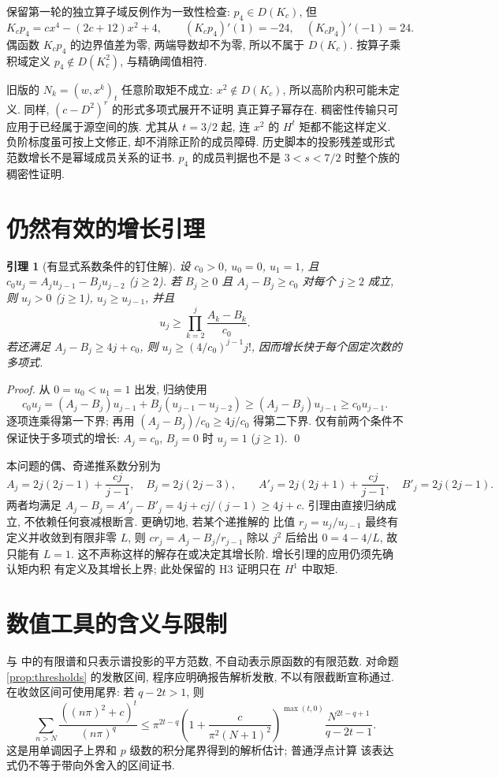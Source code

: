 \documentclass[UTF8]{ctexart}
\newtheorem{lemma}[theorem]{引理}
\begin{document}
保留第一轮的独立算子域反例作为一致性检查:
$p_4\in D(K_c)$, 但
\[
 K_cp_4=cx^4-(2c+12)x^2+4,\qquad (K_cp_4)'(1)=-24,\quad
 (K_cp_4)'(-1)=24.
\]
偶函数 $K_cp_4$ 的边界值差为零, 两端导数却不为零, 所以不属于 $D(K_c)$.
按算子乘积域定义 $p_4\notin D(K_c^2)$, 与精确阈值相符.

旧版的 $N_k=(w,x^k)_t$ 任意阶取矩不成立: $x^2\notin D(K_c)$,
所以高阶内积可能未定义. 同样, $(c-D^2)^r$ 的形式多项式展开不证明
真正算子幂存在. 稠密性传输只可应用于已经属于源空间的族.
尤其从 $t=3/2$ 起, 连 $x^2$ 的 $H^t$ 矩都不能这样定义.
负阶标度虽可按上文修正, 却不消除正阶的成员障碍.
历史脚本的投影残差或形式范数增长不是幂域成员关系的证书.
$p_4$ 的成员判据也不是 $3<s<7/2$ 时整个族的稠密性证明.

\section{仍然有效的增长引理}
\begin{lemma}[有显式系数条件的钉住解]\label{lem:growth}
设 $c_0>0$, $u_0=0$, $u_1=1$, 且
$c_0u_j=A_ju_{j-1}-B_ju_{j-2}$ ($j\ge2$).
若 $B_j\ge0$ 且 $A_j-B_j\ge c_0$ 对每个 $j\ge2$ 成立, 则
$u_j>0$ ($j\ge1$), $u_j\ge u_{j-1}$, 并且
\[
 u_j\ge\prod_{k=2}^j\frac{A_k-B_k}{c_0}.
\]
若还满足 $A_j-B_j\ge4j+c_0$, 则
$u_j\ge(4/c_0)^{j-1}j!$, 因而增长快于每个固定次数的多项式.
\end{lemma}
\begin{proof}
从 $0=u_0<u_1=1$ 出发, 归纳使用
\[
 c_0u_j=(A_j-B_j)u_{j-1}+B_j(u_{j-1}-u_{j-2})
 \ge(A_j-B_j)u_{j-1}\ge c_0u_{j-1}.
\]
逐项连乘得第一下界; 再用 $(A_j-B_j)/c_0\ge4j/c_0$ 得第二下界.
仅有前两个条件不保证快于多项式的增长: $A_j=c_0$, $B_j=0$ 时
$u_j=1$ ($j\ge1$). \qed
\end{proof}

本问题的偶、奇递推系数分别为
\[
 A_j=2j(2j-1)+\frac{cj}{j-1},\quad B_j=2j(2j-3),\qquad
 A'_j=2j(2j+1)+\frac{cj}{j-1},\quad B'_j=2j(2j-1).
\]
两者均满足 $A_j-B_j=A'_j-B'_j=4j+cj/(j-1)\ge4j+c$.
引理由直接归纳成立, 不依赖任何衰减根断言. 更确切地, 若某个递推解的
比值 $r_j=u_j/u_{j-1}$ 最终有定义并收敛到有限非零 $L$, 则
$cr_j=A_j-B_j/r_{j-1}$ 除以 $j^2$ 后给出 $0=4-4/L$, 故只能有 $L=1$.
这不声称这样的解存在或决定其增长阶. 增长引理的应用仍须先确认矩内积
有定义及其增长上界; 此处保留的 H3 证明只在 $H^1$ 中取矩.

\section{数值工具的含义与限制}
 与
 中的有限谱和只表示谱投影的平方范数,
不自动表示原函数的有限范数. 对命题 \ref{prop:thresholds} 的发散区间,
程序应明确报告解析发散, 不以有限截断宣称通过. 在收敛区间可使用尾界:
若 $q-2t>1$, 则
\[
 \sum_{n>N}\frac{((n\pi)^2+c)^t}{(n\pi)^q}
 \le \pi^{2t-q}\left(1+\frac{c}{\pi^2(N+1)^2}\right)^{\max(t,0)}
 \frac{N^{2t-q+1}}{q-2t-1}.
\]
这是用单调因子上界和 $p$ 级数的积分尾界得到的解析估计; 普通浮点计算
该表达式仍不等于带向外舍入的区间证书.
\end{document}
